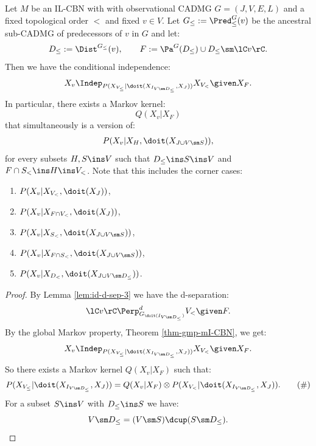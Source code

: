 \begin{Lem}
    \label{lem:int-dist-per-node}
    Let $M$ be an IL-CBN with with observational CADMG $G=(J,V,E,L)$ and a fixed topological order $<$ and fixed $v \in V$.
    Let $G_\le:=\Pred^G_\le(v)$ be the ancestral sub-CADMG of predecessors of $v$ in $G$ and let:
    \[ D_\le := \Dist^{G_\le}(v), \qquad F:= \Pa^G(D_\le) \cup D_\le \sm \lC v \rC. \]
   Then we have the conditional independence:
   \[ X_v \Indep_{P(X_{V_\le}|\doit(X_{I_{V\sm D_\le}},X_J))}  X_{V_<} \given X_F.\]
   In particular, there exists a Markov kernel:
   \[ Q(X_v|X_F) \] 
   that simultaneously is a version of:
   \begin{align*} 
       P(X_v|X_H,\doit(X_{J \cup V\sm S})), 
    \end{align*}
   for every subsets $H,S \ins V$ such that $D_\le \ins S \ins V$ and $F \cap S_< \ins  H \ins V_<$.
  Note that this includes the corner cases: 
  \begin{enumerate}
      \item $P(X_v|X_{V_<},\doit(X_J))$,
      \item $P(X_v|X_{F\cap V_<},\doit(X_J))$,
      \item $P(X_v|X_{S_<},\doit(X_{J \cup V\sm S}))$,
      \item $P(X_v|X_{F \cap S_<},\doit(X_{J \cup V\sm S}))$,
      \item $P(X_v|X_{D_<},\doit(X_{J \cup V\sm D_\le}))$.
  \end{enumerate}
 \begin{proof}
        By Lemma \ref{lem:id-d-sep-3} we have the d-separation:
   \[ \lC v \rC \Perp^d_{G_{\doit( I_{V\sm D_\le} )}} V_< \given F.  \]
   By the global Markov property, Theorem \ref{thm-gmp-mI-CBN}, we get: 
   \[ X_v \Indep_{P(X_{V_\le}|\doit(X_{I_{V\sm D_\le}},X_J))}  X_{V_<} \given X_F.\]
   So there exists a Markov kernel $Q(X_v|X_F)$ such that:
   \begin{align*}  P(X_{V_\le}|\doit(X_{I_{V\sm D_\le}},X_J)) = Q(X_v|X_F) \otimes P(X_{V_<}|\doit(X_{I_{V\sm D_\le}},X_J)). 
       \label{eq:q-mk-1}\tag{\#}
   \end{align*}
   For a subset $S \ins V$ with $D_\le \ins S$ we have: 
       \[ V\sm D_\le = (V\sm S) \dcup (S\sm D_\le). \] 

\end{proof}
\end{Lem}

